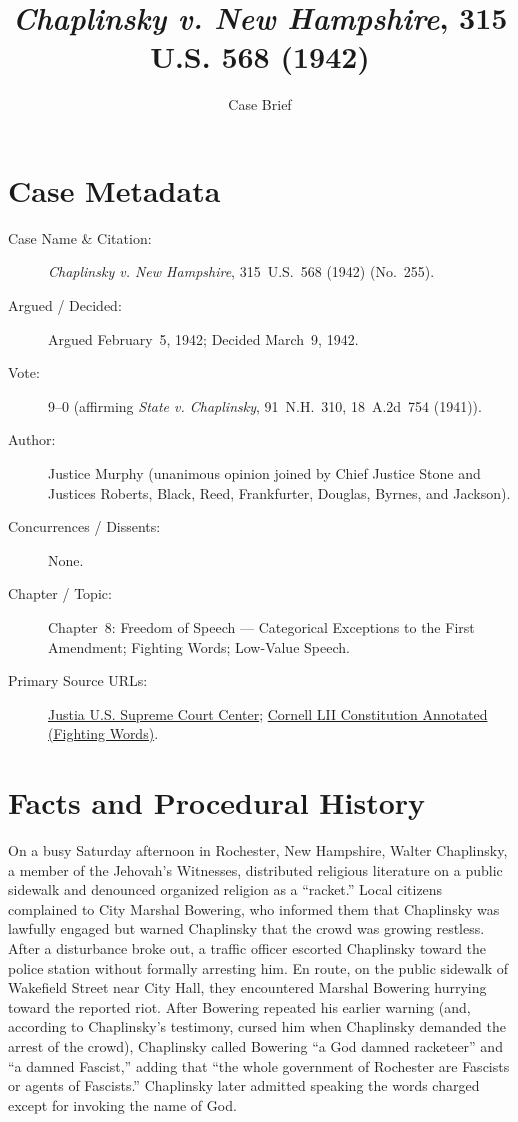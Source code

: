 \documentclass[12pt]{article}
\title{\textit{Chaplinsky v. New Hampshire}, 315 U.S. 568 (1942)}
\author{Case Brief}
\date{}
\begin{document}
\maketitle

\section{Case Metadata}
\begin{description}
  \item[Case Name \& Citation:] \textit{Chaplinsky v. New Hampshire}, 315~U.S.~568 (1942) (No.~255).
  \item[Argued / Decided:] Argued February~5, 1942; Decided March~9, 1942.
  \item[Vote:] 9--0 (affirming \textit{State v. Chaplinsky}, 91~N.H.~310, 18~A.2d~754 (1941)).
  \item[Author:] Justice Murphy (unanimous opinion joined by Chief Justice Stone and Justices Roberts, Black, Reed, Frankfurter, Douglas, Byrnes, and Jackson).
  \item[Concurrences / Dissents:] None.
  \item[Chapter / Topic:] Chapter~8: Freedom of Speech --- Categorical Exceptions to the First Amendment; Fighting Words; Low-Value Speech.
  \item[Primary Source URLs:] \href{https://supreme.justia.com/cases/federal/us/315/568/}{Justia U.S. Supreme Court Center}; \href{https://www.law.cornell.edu/constitution-conan/amendment-1/fighting-words}{Cornell LII Constitution Annotated (Fighting Words)}.
\end{description}

\section{Facts and Procedural History}
On a busy Saturday afternoon in Rochester, New Hampshire, Walter Chaplinsky, a member of the Jehovah's Witnesses, distributed religious literature on a public sidewalk and denounced organized religion as a ``racket.'' Local citizens complained to City Marshal Bowering, who informed them that Chaplinsky was lawfully engaged but warned Chaplinsky that the crowd was growing restless. After a disturbance broke out, a traffic officer escorted Chaplinsky toward the police station without formally arresting him. En route, on the public sidewalk of Wakefield Street near City Hall, they encountered Marshal Bowering hurrying toward the reported riot. After Bowering repeated his earlier warning (and, according to Chaplinsky's testimony, cursed him when Chaplinsky demanded the arrest of the crowd), Chaplinsky called Bowering ``a God damned racketeer'' and ``a damned Fascist,'' adding that ``the whole government of Rochester are Fascists or agents of Fascists.'' Chaplinsky later admitted speaking the words charged except for invoking the name of God.
\end{document}
